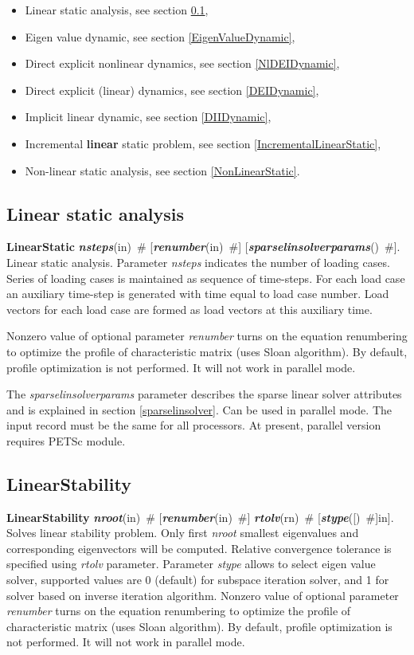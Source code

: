 \documentclass[draft]{article}
\newcommand{\param}[1]{{\em #1}}
\newcommand{\keywordnotype}[1]{\mbox{{\it{\bf{#1}}}}}
\newcommand{\keyword}[2]{\mbox{{\keywordnotype{#1}\tiny (#2)}}}
\newcommand{\entKeywordInst}[1]{\mbox{{\bf{{#1}}}}}
\newcommand{\field}[2]{\mbox{\keyword{#1}{#2}~\#}}
\newcommand{\optField}[2]{\mbox{[\field{#1}{#2}]}}
\newcommand{\Pmode}[1]{{\sffamily #1}}
\begin{document}
\begin{itemize}
\item Linear static analysis, see section \ref{LinearStatic},
\item Eigen value dynamic, see section \ref{EigenValueDynamic},
\item Direct explicit  nonlinear dynamics, see section
\ref{NlDEIDynamic},
\item Direct explicit (linear) dynamics, see section \ref{DEIDynamic},
\item Implicit linear dynamic, see section \ref{DIIDynamic},
\item Incremental {\bf linear} static problem, see section \ref{IncrementalLinearStatic},
\item Non-linear static analysis, see section \ref{NonLinearStatic}.
\end{itemize}

\subsection{Linear static analysis}
\label{LinearStatic}
\entKeywordInst{LinearStatic} \field{nsteps}{in} \optField{renumber}{in}
\optField{sparselinsolverparams}{}.\\
Linear static analysis.
Parameter \param{nsteps} indicates the number of loading cases.
Series of loading cases is maintained as sequence of time-steps.
For each load case an auxiliary time-step is generated with time
equal to load case number.
Load vectors for each load case are formed as load vectors at
this auxiliary time.

Nonzero value of optional parameter \param{renumber} turns on the
equation renumbering to optimize the profile of characteristic matrix
(uses Sloan algorithm). By default, profile optimization is not
performed. It will not work in parallel mode.

The  \param{sparselinsolverparams} parameter describes the sparse
linear solver attributes and is explained in section \ref{sparselinsolver}.
\Pmode{Can be used in parallel mode. The input record must be the same
for all processors. At present, parallel version requires PETSc module.}


\subsection{LinearStability}
\label{LinearStability}
\entKeywordInst{LinearStability} \field{nroot}{in} \optField{renumber}{in}
\field{rtolv}{rn} \optField{stype}[in].\\
Solves linear stability problem. Only first \param{nroot} smallest
eigenvalues and corresponding eigenvectors will be computed. 
Relative convergence tolerance is specified using \param{rtolv} parameter.
Parameter \param{stype} allows to select eigen value solver, supported
values are 0 (default) for subspace iteration solver, and 1 for solver
based on inverse iteration algorithm.
Nonzero value of optional parameter \param{renumber} turns on the
equation renumbering to optimize the profile of characteristic matrix
(uses Sloan algorithm). By default, profile optimization is not
performed. It will not work in parallel mode.
\end{document}
